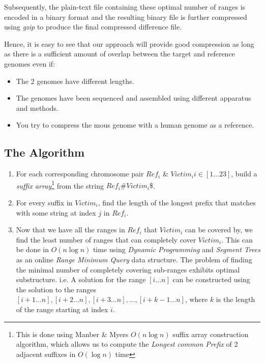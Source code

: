 \documentclass[11pt]{article}
\begin{document}
Subsequently, the plain-text file containing these optimal number of
ranges is encoded in a binary format and the resulting binary file is
further compressed using \textit{gzip} to produce the final compressed
difference file.

Hence, it is easy to see that our approach will provide good
compression as long as there is a sufficient amount of overlap between
the target and reference genomes even if:
\begin{itemize}
\item The 2 genomes have different lengths.
\item The genomes have been sequenced and assembled using different
  apparatus and methods.
\item You try to compress the mous genome with a human genome as a
  reference.
\end{itemize}


\subsection{The Algorithm}

\begin{enumerate}

\item For each corresponding chromosome pair ${Ref}_i$ \& $Victim_i i
  \in [1\ldots{}23]$, build a
  \textit{suffix array}\footnote{This is done using Manber \& Myers
    $O(n\log{n})$ suffix array construction
    algorithm\cite{manbermyers}, which allows us to compute the
    \textit{Longest common Prefix} of 2 adjacent suffixes in
    $O(\log{n})$ time} from the string $Ref_i\#Victim_i\$$.

\item For every suffix in ${Victim}_i$, find the length of the longest
  prefix that matches with some string at index $j$ in ${Ref}_i$.

\item Now that we have all the ranges in $Ref_i$ that $Victim_i$ can
  be covered by, we find the least number of ranges that can
  completely cover $Victim_i$. This can be done in $O(n\log{n})$ time
  using \textit{Dynamic Programming} and \textit{Segment Trees} as an
  online \textit{Range Minimum Query} data structure. The problem of
  finding the minimal number of completely covering sub-ranges
  exhibits optimal substructure. i.e. A solution for the range
  $[i\ldots{}n]$ can be constructed using the solution to the ranges
  $[i+1\ldots{}n], [i+2\ldots{}n], [i+3\ldots{}n], \ldots{},
  [i+k-1\ldots{}n]$, where $k$ is the length of the range starting at
  index $i$.

\end{enumerate}
\end{document}
